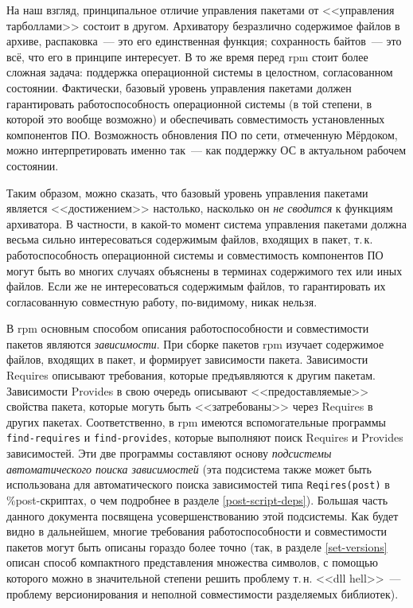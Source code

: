 \documentclass[russian,a4paper,12pt,titlepage]{article}
\begin{document}
На наш взгляд, принципальное отличие управления пакетами от <<управления тарболлами>> состоит в другом.
Архиватору безразлично содержимое файлов в архиве, распаковка~--- это его единственная функция; сохранность
байтов~--- это всё, что его в принципе интересует.  В то же время перед rpm стоит более сложная задача:
поддержка операционной системы в целостном, согласованном состоянии.  Фактически, базовый уровень
управления пакетами должен гарантировать работоспособность операционной системы (в той степени,
в которой это вообще возможно) и обеспечивать совместимость установленных компонентов ПО.  Возможность
обновления ПО по сети, отмеченную Мёрдоком, можно интерпретировать именно так~--- как поддержку ОС
в актуальном рабочем состоянии.

Таким образом, можно сказать, что базовый уровень управления пакетами является <<достижением>> настолько,
насколько он \textit{не сводится} к функциям архиватора.  В частности, в какой-то момент система управления
пакетами должна весьма сильно интересоваться содержимым файлов, входящих в пакет, т.\,к. работоспособность
операционной системы и совместимость компонентов ПО могут быть во многих случаях объяснены в терминах
содержимого тех или иных файлов.  Если же не интересоваться содержимым файлов, то гарантировать их согласованную
совместную работу, по-видимому, никак нельзя.

В rpm основным способом описания работоспособности и совместимости пакетов являются \textit{зависимости}.
При сборке пакетов rpm изучает содержимое файлов, входящих в пакет, и формирует зависимости пакета.
Зависимости Requires описывают требования, которые предъявляются к другим пакетам.  Зависимости Provides
в свою очередь описывают <<предоставляемые>> свойства пакета, которые могуть быть <<затребованы>> через
Requires в других пакетах.  Соответственно, в rpm имеются вспомогательные программы \verb|find-requires|
и \verb|find-provides|, которые выполняют поиск Requires и Provides зависимостей.  Эти две программы
составляют основу \textit{подсистемы автоматического поиска зависимостей} (эта подсистема также может быть
использована для автоматического поиска зависимостей типа \verb|Reqires(post)| в \%post-скриптах,
о чем подробнее в разделе \ref{post-script-deps}).  Большая часть данного документа посвящена
усовершенствованию этой подсистемы.  Как будет видно в дальнейшем, многие требования работоспособности
и совместимости пакетов могут быть описаны гораздо более точно (так, в разделе \ref{set-versions} описан
способ компактного представления множества символов, с помощью которого можно в значительной степени
решить проблему т.\,н. <<dll hell>>~--- проблему версионирования и неполной совместимости разделяемых библиотек).
\end{document}
